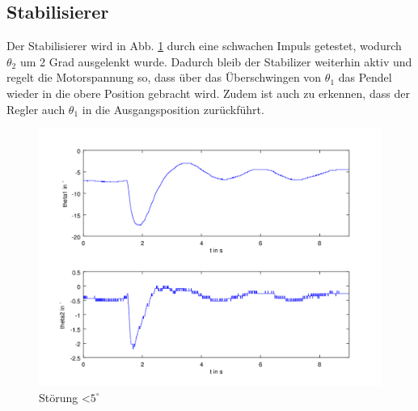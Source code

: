 \subsection{Stabilisierer}

Der Stabilisierer wird in Abb. \ref{fig.Stabilisierer-Plot} durch eine schwachen Impuls getestet, wodurch $\theta_2$ um 2 Grad ausgelenkt wurde. Dadurch bleib der Stabilizer weiterhin aktiv und regelt die Motorspannung so, dass über das Überschwingen von $ \theta_1$ das Pendel wieder in die obere Position gebracht wird. Zudem ist auch zu erkennen, dass der Regler auch $ \theta_1$ in die Ausgangsposition zurückführt.
\begin{figure}[htbp]
	\label{fig.Stabilisierer-Plot}
	\centering
	\includegraphics[width=1.\textwidth]{Grafiken/Stab_lang.png}
	\caption{Störung \textless $5^{\circ}$}
\end{figure}


